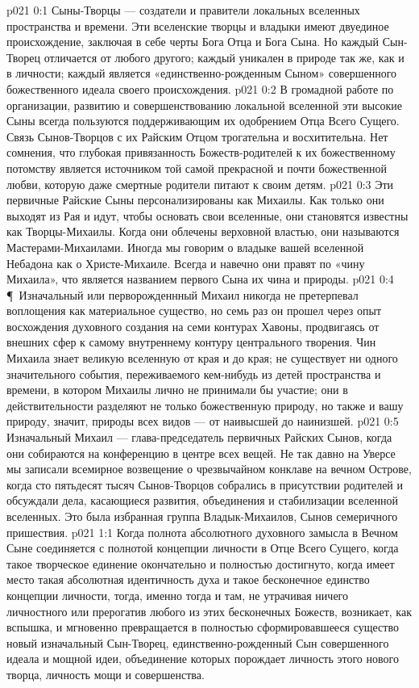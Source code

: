 \vs p021 0:1 Сыны\hyp{}Творцы --- создатели и правители локальных вселенных пространства и времени. Эти вселенские творцы и владыки имеют двуединое происхождение, заключая в себе черты Бога Отца и Бога Сына. Но каждый Сын\hyp{}Творец отличается от любого другого; каждый уникален в природе так же, как и в личности; каждый является «единственно\hyp{}рожденным Сыном» совершенного божественного идеала своего происхождения.
\vs p021 0:2 В громадной работе по организации, развитию и совершенствованию локальной вселенной эти высокие Сыны всегда пользуются поддерживающим их одобрением Отца Всего Сущего. Связь Сынов\hyp{}Творцов с их Райским Отцом трогательна и восхитительна. Нет сомнения, что глубокая привязанность Божеств\hyp{}родителей к их божественному потомству является источником той самой прекрасной и почти божественной любви, которую даже смертные родители питают к своим детям.
\vs p021 0:3 Эти первичные Райские Сыны персонализированы как Михаилы. Как только они выходят из Рая и идут, чтобы основать свои вселенные, они становятся известны как Творцы\hyp{}Михаилы. Когда они облечены верховной властью, они называются Мастерами\hyp{}Михаилами. Иногда мы говорим о владыке вашей вселенной Небадона как о Христе\hyp{}Михаиле. Всегда и навечно они правят по «чину Михаила», что является названием первого Сына их чина и природы.
\vs p021 0:4 \P\ Изначальный или перворожденнный Михаил никогда не претерпевал воплощения как материальное существо, но семь раз он прошел через опыт восхождения духовного создания на семи контурах Хавоны, продвигаясь от внешних сфер к самому внутреннему контуру центрального творения. Чин Михаила знает великую вселенную от края и до края; не существует ни одного значительного события, переживаемого кем\hyp{}нибудь из детей пространства и времени, в котором Михаилы лично не принимали бы участие; они в действительности разделяют не только божественную природу, но также и вашу природу, значит, природы всех видов --- от наивысшей до наинизшей.
\vs p021 0:5 Изначальный Михаил --- глава\hyp{}председатель первичных Райских Сынов, когда они собираются на конференцию в центре всех вещей. Не так давно на Уверсе мы записали всемирное возвещение о чрезвычайном конклаве на вечном Острове, когда сто пятьдесят тысяч Сынов\hyp{}Творцов собрались в присутствии родителей и обсуждали дела, касающиеся развития, объединения и стабилизации вселенной вселенных. Это была избранная группа Владык\hyp{}Михаилов, Сынов семеричного пришествия.
\vs p021 1:1 Когда полнота абсолютного духовного замысла в Вечном Сыне соединяется с полнотой концепции личности в Отце Всего Сущего, когда такое творческое единение окончательно и полностью достигнуто, когда имеет место такая абсолютная идентичность духа и такое бесконечное единство концепции личности, тогда, именно тогда и там, не утрачивая ничего личностного или прерогатив любого из этих бесконечных Божеств, возникает, как вспышка, и мгновенно превращается в полностью сформировавшееся существо новый изначальный Сын\hyp{}Творец, единственно\hyp{}рожденный Сын совершенного идеала и мощной идеи, объединение которых порождает личность этого нового творца, личность мощи и совершенства.
